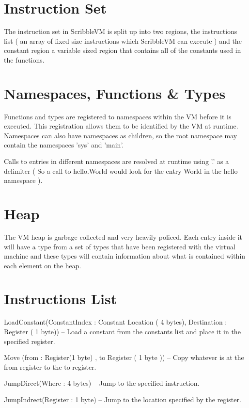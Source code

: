 \documentclass[]{final_report}
\begin{document}
\section{Instruction Set}

The instruction set in ScribbleVM is split up into two regions, the instructions list ( an array of fixed size
instructions which ScribbleVM can execute ) and the constant region a variable sized region that contains all
of the constants used in the functions. 

\section{Namespaces, Functions \& Types}

Functions and types are registered to namespaces within the VM before it is executed. This registration
allows them to be identified by the VM at runtime.
Namespaces can also have namespaces as children, so the root namespace may contain the namespaces
'sys' and 'main'.

Calls to entries in different namespaces are resolved at runtime using '.' as a delimiter ( So a call to
hello.World would look for the entry World in the hello namespace ).

\section{Heap}

The VM heap is garbage collected and very heavily policed. Each entry inside it will have a type from a set of
types that have been registered with the virtual machine and these types will contain information about what
is contained within each element on the heap.

\section{Instructions List}

LoadConstant(ConstantIndex : Constant Location ( 4 bytes), Destination : Register ( 1 byte)) – Load a constant from the constants list and place it in the specified register.

Move (from : Register(1 byte) , to Register ( 1 byte )) – Copy whatever is at the from register to the
to register.

JumpDirect(Where : 4 bytes) – Jump to the specified instruction.

JumpIndrect(Register : 1 byte) – Jump to the location specified by the register.
\end{document}
